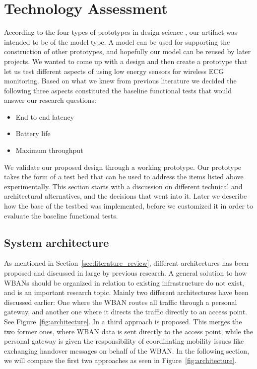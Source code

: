 \section{Technology Assessment} %
\label{sec:technology_assessment}

According to the four types of prototypes in design science \cite{Johannesson:2014co}, our artifact was intended to be of the model type. A model can be used for supporting the construction of other prototypes, and hopefully our model can be reused by later projects. We wanted to come up with a design and then create a prototype that let us test different aspects of using low energy sensors for wireless ECG monitoring. Based on what we knew from previous literature we decided the following three aspects constituted the baseline functional tests that would answer our research questions:
\begin{itemize}
	
	\item End to end latency
	\item Battery life
	\item Maximum throughput
  
\end{itemize}
\noindent
We validate our proposed design through a working prototype. Our prototype takes the form of a test bed that can be used to address the items listed above experimentally. This section starts with a discussion on different technical and architectural alternatives, and the decisions that went into it. Later we describe how the base of the testbed was implemented, before we customized it in order to evaluate the baseline functional tests.

\subsection{System architecture} %
\label{sub:system_architecture}

As mentioned in Section~\ref{sec:literature_review}, different architectures has been proposed and discussed in large by previous research. A general solution to how WBANs should be organized in relation to existing infrastructure do not exist, and is an important research topic. Mainly two different architectures have been discussed earlier: One where the WBAN routes all traffic through a personal gateway, and another one where it directs the traffic directly to an access point. See Figure~\ref{fig:architecture}. In \cite{Shahamabadi:2013df} a third approach is proposed. This merges the two former ones, where WBAN data is sent directly to the access point, while the personal gateway is given the responsibility of coordinating mobility issues like exchanging handover messages on behalf of the WBAN. In the following section, we will compare the first two approaches as seen in Figure~\ref{fig:architecture}.

